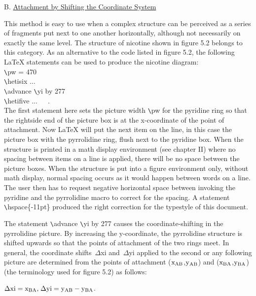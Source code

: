  \vspace{\len mm}
 \noindent B. \underline{Attachment by Shifting the Coordinate
                         System}

 This method is easy to use when a complex structure can be
 perceived as a series of fragments put next to one another
 horizontally, although not necessarily on exactly the same
 level. The structure of nicotine shown in figure 5.2
 belongs to this category. As an alternative to the code
 listed in figure 5.2, the following LaTeX statements can 
 be used to produce the nicotine diagram: \\
 \indent \verb+\+pw = 470 \\
 \indent \verb+\+hetisix $\ldots$ \\
 \indent \verb+\+advance \verb+\+yi by 277  \\
 \indent \verb+\+hetifive $\ldots$\ \ \ . \\
 The first statement here sets the picture width \verb+\+pw
 for the pyridine ring so that the rightside end of the
 picture box is at the x-coordinate of the point of attachment.
 Now LaTeX will put the next item on the line, in this case
 the picture box with the pyrrolidine ring, flush next to
 the pyridine box. When the structure is printed in a math
 display environment (see chapter II) where no spacing between
 items on a line is applied, there will be no space between
 the picture boxes. When the structure is put into a figure
 environment only, without math display, normal spacing
 occurs as it would happen between words on a line.
 The user then has to request negative horizontal space
 between invoking the pyridine and the pyrrolidine macro
 to correct for the spacing. A statement                
 \verb+\+hspace\{-11pt\} produced the right correction for the
 typestyle of this document.
    
 The statement \verb+\+advance \verb+\+yi by 277 causes the
 coordinate-shifting in the pyrrolidine picture.
 By increasing the y-coordinate, the pyrrolidine structure
 is shifted upwards so that the points of attachment
 of the two rings meet. In general, the coordinate shifts
 $\,\Delta $xi and $\,\Delta $yi applied to the second or any
 following picture are determined from the points of
 attachment (${\rm x_{AB}}$,${\rm y_{AB}}$) and 
 (${\rm x_{BA}}$,${\rm y_{BA}}$)
 (the terminology used for figure 5.2) as follows: \\
 \centerline{${\rm \Delta xi=x_{BA} \mbox{,}\; 
                   \Delta yi=y_{AB}-y_{BA} }$.}
 
